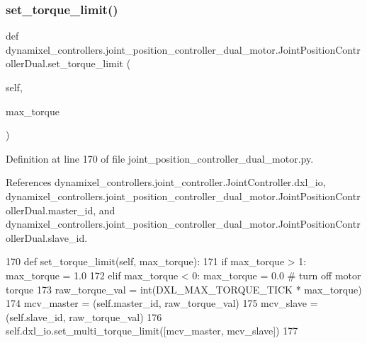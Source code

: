 \subsubsection{\texorpdfstring{set\+\_\+torque\+\_\+limit()}{set\_torque\_limit()}}
{\footnotesize\ttfamily def dynamixel\+\_\+controllers.\+joint\+\_\+position\+\_\+controller\+\_\+dual\+\_\+motor.\+Joint\+Position\+Controller\+Dual.\+set\+\_\+torque\+\_\+limit (\begin{DoxyParamCaption}\item[{}]{self,  }\item[{}]{max\+\_\+torque }\end{DoxyParamCaption})}



Definition at line 170 of file joint\+\_\+position\+\_\+controller\+\_\+dual\+\_\+motor.\+py.



References dynamixel\+\_\+controllers.\+joint\+\_\+controller.\+Joint\+Controller.\+dxl\+\_\+io, dynamixel\+\_\+controllers.\+joint\+\_\+position\+\_\+controller\+\_\+dual\+\_\+motor.\+Joint\+Position\+Controller\+Dual.\+master\+\_\+id, and dynamixel\+\_\+controllers.\+joint\+\_\+position\+\_\+controller\+\_\+dual\+\_\+motor.\+Joint\+Position\+Controller\+Dual.\+slave\+\_\+id.


\begin{DoxyCode}
170     \textcolor{keyword}{def }set\_torque\_limit(self, max\_torque):
171         \textcolor{keywordflow}{if} max\_torque > 1: max\_torque = 1.0
172         \textcolor{keywordflow}{elif} max\_torque < 0: max\_torque = 0.0  \textcolor{comment}{# turn off motor torque}
173         raw\_torque\_val = int(DXL\_MAX\_TORQUE\_TICK * max\_torque)
174         mcv\_master = (self.master\_id, raw\_torque\_val)
175         mcv\_slave = (self.slave\_id, raw\_torque\_val)
176         self.dxl\_io.set\_multi\_torque\_limit([mcv\_master, mcv\_slave])
177 
\end{DoxyCode}
\mbox{\label{classdynamixel__controllers_1_1joint__position__controller__dual__motor_1_1_joint_position_controller_dual_a5a96d3bd5d40feb12ffcb581d7acedc1}} 

